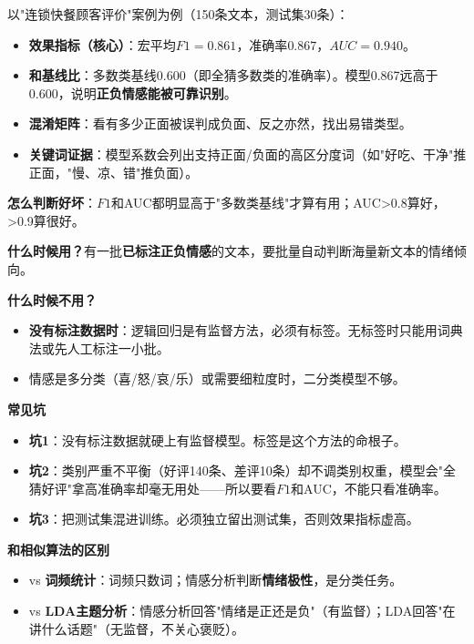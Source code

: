 \begin{algoresult}
以"连锁快餐顾客评价"案例为例（150条文本，测试集30条）：

\begin{itemize}
    \item \textbf{效果指标（核心）}：宏平均$F1=0.861$，准确率$0.867$，$AUC=0.940$。
    \item \textbf{和基线比}：多数类基线$0.600$（即全猜多数类的准确率）。模型0.867远高于0.600，说明\textbf{正负情感能被可靠识别}。
    \item \textbf{混淆矩阵}：看有多少正面被误判成负面、反之亦然，找出易错类型。
    \item \textbf{关键词证据}：模型系数会列出支持正面/负面的高区分度词（如"好吃、干净"推正面，"慢、凉、错"推负面）。
\end{itemize}

\textbf{怎么判断好坏}：$F1$和AUC都明显高于"多数类基线"才算有用；AUC>0.8算好，>0.9算很好。
\end{algoresult}

\begin{algonotes}
\textbf{什么时候用？}有一批\textbf{已标注正负情感}的文本，要批量自动判断海量新文本的情绪倾向。

\textbf{什么时候不用？}
\begin{itemize}
    \item \textbf{没有标注数据时}：逻辑回归是有监督方法，必须有标签。无标签时只能用词典法或先人工标注一小批。
    \item 情感是多分类（喜/怒/哀/乐）或需要细粒度时，二分类模型不够。
\end{itemize}

\textbf{常见坑}
\begin{itemize}
    \item \textbf{坑1}：没有标注数据就硬上有监督模型。标签是这个方法的命根子。
    \item \textbf{坑2}：类别严重不平衡（好评140条、差评10条）却不调类别权重，模型会"全猜好评"拿高准确率却毫无用处——所以要看$F1$和AUC，不能只看准确率。
    \item \textbf{坑3}：把测试集混进训练。必须独立留出测试集，否则效果指标虚高。
\end{itemize}

\textbf{和相似算法的区别}
\begin{itemize}
    \item vs \textbf{词频统计}：词频只数词；情感分析判断\textbf{情绪极性}，是分类任务。
    \item vs \textbf{LDA主题分析}：情感分析回答"情绪是正还是负"（有监督）；LDA回答"在讲什么话题"（无监督，不关心褒贬）。
\end{itemize}
\end{algonotes}

